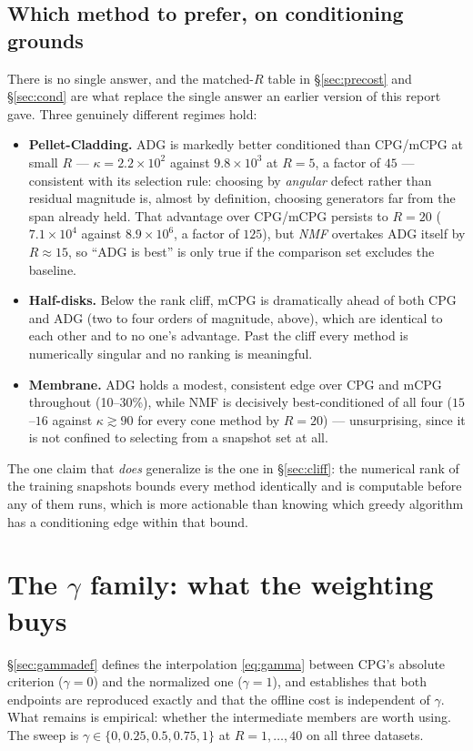 \documentclass[11pt,a4paper]{article}
\begin{document}
\subsection{Which method to prefer, on conditioning grounds}
There is no single answer, and the matched-$R$ table in
\S\ref{sec:precost} and \S\ref{sec:cond} are what replace the single answer an earlier version
of this report gave. Three genuinely different regimes hold:

\begin{itemize}
\item \textbf{Pellet-Cladding.} ADG is markedly better conditioned than CPG/mCPG at small
$R$ --- $\kappa=2.2\times10^{2}$ against $9.8\times10^{3}$ at $R=5$, a factor of $45$ ---
consistent with its selection rule: choosing by \emph{angular} defect rather than residual
magnitude is, almost by definition, choosing generators far from the span already held.
That advantage over CPG/mCPG persists to $R=20$ ($7.1\times10^{4}$ against
$8.9\times10^{6}$, a factor of $125$), but \emph{NMF} overtakes ADG itself by
$R\approx15$, so ``ADG is best'' is only true if the comparison set excludes the baseline.
\item \textbf{Half-disks.} Below the rank cliff, mCPG is dramatically ahead of both CPG
and ADG (two to four orders of magnitude, above), which are identical to each other and
to no one's advantage. Past the cliff every method is numerically singular and no
ranking is meaningful.
\item \textbf{Membrane.} ADG holds a modest, consistent edge over CPG and mCPG throughout
(10--30\%), while NMF is decisively best-conditioned of all four ($15$--$16$ against
$\kappa\gtrsim90$ for every cone method by $R=20$) --- unsurprising, since it is not
confined to selecting from a snapshot set at all.
\end{itemize}

\noindent The one claim that \emph{does} generalize is the one in \S\ref{sec:cliff}: the
numerical rank of the training snapshots bounds every method identically and is
computable before any of them runs, which is more actionable than knowing which greedy
algorithm has a conditioning edge within that bound.

\section{The $\gamma$ family: what the weighting buys}\label{sec:gamma}

\S\ref{sec:gammadef} defines the interpolation \eqref{eq:gamma} between CPG's absolute
criterion ($\gamma=0$) and the normalized one ($\gamma=1$), and establishes that both
endpoints are reproduced exactly and that the offline cost is independent of $\gamma$.
What remains is empirical: whether the intermediate members are worth using. The sweep is
$\gamma\in\{0,0.25,0.5,0.75,1\}$ at $R=1,\dots,40$ on all three datasets.
\end{document}
